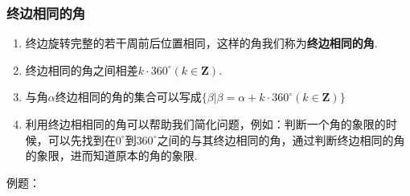 \subsubsection*{终边相同的角}
\begin{enumerate}
    \item 终边旋转完整的若干周前后位置相同，这样的角我们称为\textbf{终边相同的角}.
    \item 终边相同的角之间相差$k \cdot 360^{\circ} (k \in \mathbf{Z})$.
    \item 与角$\alpha$终边相同的角的集合可以写成$\{\beta | \beta = \alpha + k \cdot 360^{\circ} (k \in \mathbf{Z}) \}$
    \item 利用终边相相同的角可以帮助我们简化问题，例如：判断一个角的象限的时候，可以先找到在$0^{\circ}$到$360^{\circ}$之间的与其终边相同的角，通过判断终边相同的角的象限，进而知道原本的角的象限.
\end{enumerate}
例题：
